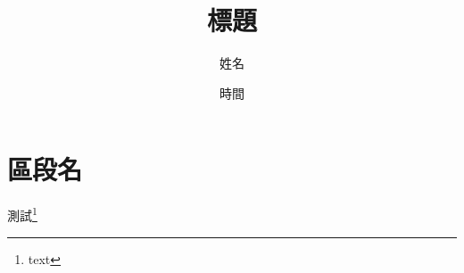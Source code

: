 \documentclass{article}
\title{標題}
\author{姓名}
\date{時間}
\begin{document}
\maketitle

\section{區段名}

測試\footnote{text}
\end{document}
